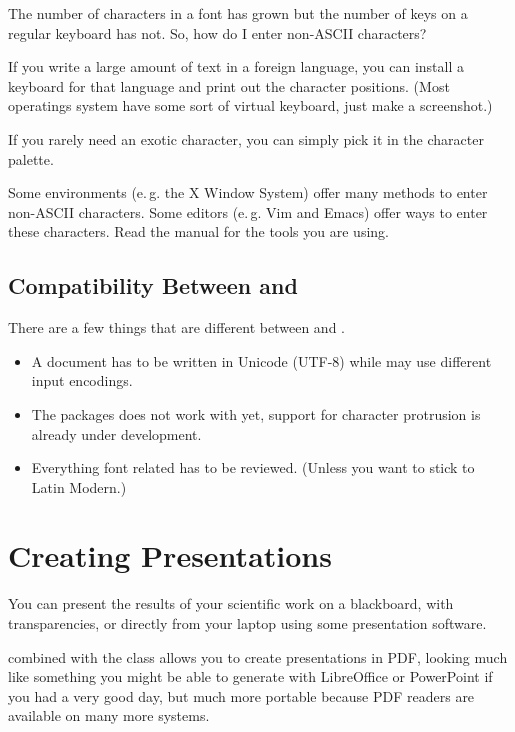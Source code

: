 The number of characters in a font has grown but the number of keys on a
regular keyboard has not. So, how do I enter non-ASCII characters?

If you write a large amount of text in a foreign language, you can install a
keyboard for that language and print out the character positions. (Most
operatings system have some sort of virtual keyboard, just make a
screenshot.)

If you rarely need an exotic character, you can simply pick it in the
character palette.

Some environments (e.\,g. the X Window System) offer many methods to enter
non-ASCII characters. Some editors (e.\,g. Vim and Emacs) offer ways to
enter these characters. Read the manual for the tools you are using.

\subsection{Compatibility Between  and }

There are a few things that are different between  and .

\begin{itemize}
	\item A  document has to be written in
	Unicode (UTF-8) while  may use different input encodings.
\item The  packages does not work with  yet,
	support for character protrusion is already under development.
\item Everything font related has to be reviewed. (Unless you want to stick
	to Latin Modern.)
\end{itemize}

\section{Creating Presentations}
\label{sec:beamer}
You can present the results of your scientific work on a blackboard,
with transparencies, or directly from your laptop using some
presentation software.

 combined with the  class allows you to
create presentations in PDF, looking much like something you might be
able to generate with LibreOffice or PowerPoint if you had a very good day, but much
more portable because PDF readers are available on many more
systems.

